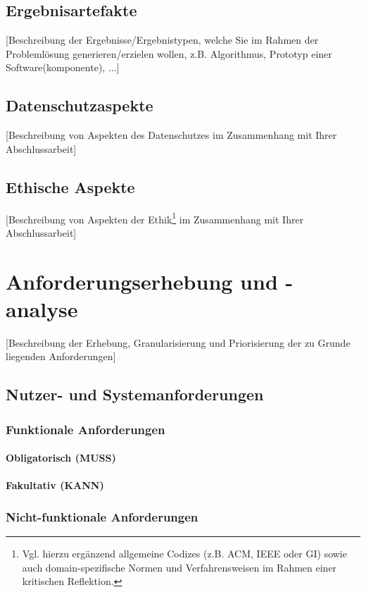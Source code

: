 \documentclass[oneside,bibliography=totocnumbered,BCOR=5mm]{scrbook}
\begin{document}
\section{Ergebnisartefakte}
[Beschreibung der Ergebnisse/Ergebnistypen, welche Sie im Rahmen der Problemlösung generieren/erzielen wollen, z.B. Algorithmus, Prototyp einer Software(komponente), ...]

\section{Datenschutzaspekte}
[Beschreibung von Aspekten des Datenschutzes im Zusammenhang mit Ihrer Abschlussarbeit]

\section{Ethische Aspekte}
[Beschreibung von Aspekten der Ethik\footnote{Vgl. hierzu ergänzend allgemeine Codizes (z.B. ACM, IEEE oder GI) sowie auch domain-spezifische Normen und Verfahrensweisen im Rahmen einer kritischen Reflektion.} im Zusammenhang mit Ihrer Abschlussarbeit]

\chapter{Anforderungserhebung und -analyse}
[Beschreibung der Erhebung, Granularisierung und Priorisierung der zu Grunde liegenden Anforderungen]

\section{Nutzer- und Systemanforderungen}

\subsection{Funktionale Anforderungen}

\subsubsection{Obligatorisch (MUSS)}

\subsubsection{Fakultativ (KANN)}

\subsection{Nicht-funktionale Anforderungen}
\end{document}
